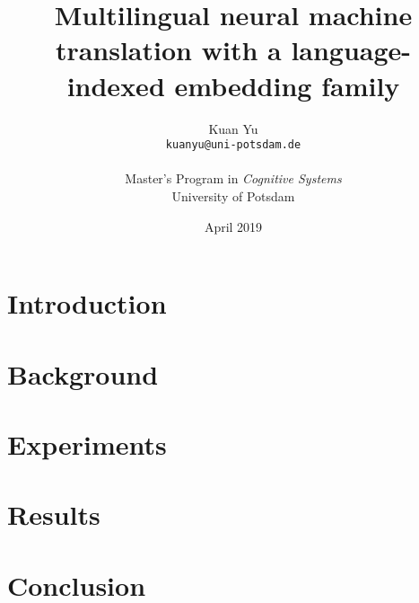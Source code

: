 \documentclass[11pt,twocolumn]{article}
\title{Multilingual neural machine translation with a language-indexed embedding family}
\author{%
  Kuan Yu\\
  \texttt{kuanyu@uni-potsdam.de}\\
  \\
  Master's Program in \emph{Cognitive Systems}\\
  University of Potsdam}
\date{April 2019}
\begin{document}
\maketitle

\begin{abstract}
\end{abstract}

\section{Introduction}\label{sec:introduction}

\section{Background}\label{sec:background}


\section{Experiments}\label{sec:experiments}

\section{Results}\label{sec:results}

\section{Conclusion}\label{sec:conclusion}

\printbibliography[]
\end{document}
